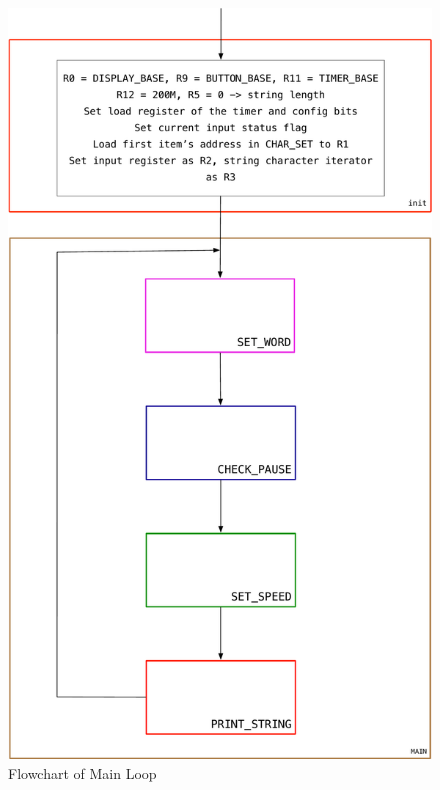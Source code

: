 \documentclass[titlepage]{article}
\begin{document}
	\begin{figure}[h]
		\centering
		\includegraphics[scale=.3]{../images/main.pdf}
		\caption{Flowchart of Main Loop}
	\end{figure}
 	\newpage
\end{document}
